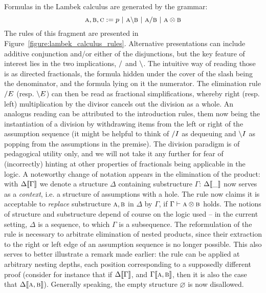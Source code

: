 Formulas in the Lambek calculus are generated by the grammar:
\begin{equation}
\prop{a}, \prop{b}, \prop{c} := p \ | \ \prop{a} \divleft \prop{b} \ | \ \prop{a} \divright \prop{b} \ | \ \prop{a} \otimes \prop{b}
\label{equation:LC}
\end{equation}
The rules of this fragment are presented in Figure~\ref{figure:lambek_calculus_rules}.
Alternative presentations can include additive conjunction and/or either of the disjunctions, but the key feature of interest lies in the two implications, $/$ and $\backslash$.
The intuitive way of reading those is as directed fractionals, the formula hidden under the cover of the slash being the denominator, and the formula lying on it the numerator.
The elimination rule $/ E$ (resp. $\backslash E$) can then be read as fractional simplifications, whereby right (resp. left) multiplication by the divisor cancels out the division as a whole.
An analogus reading can be attributed to the introduction rules, them now being the instantiation of a division by withdrawing items from the left or right of the assumption sequence (it might be helpful to think of $/ I$ as dequeuing and $\backslash I$ as popping from the assumptions in the premise).
The division paradigm is of pedagogical utility only, and we will not take it any further for fear of (incorrectly) hinting at other properties of fractionals being applicable in the logic.
A noteworthy change of notation appears in the elimination of the product: with $\Delta\llbracket{\Gamma}\rrbracket$ we denote a structure $\Delta$ containing substructure $\Gamma$: $\Delta\llbracket{\_}\rrbracket$ now serves as a \textit{context}, i.e. a structure of assumptions with a hole.
The rule now claims it is acceptable to \textit{replace} substructure $\normalfont\textsc{a}, \normalfont\textsc{b}$ in $\Delta$ by $\Gamma$, if $\Gamma \vdash \normalfont\textsc{a}\otimes\normalfont\textsc{b}$ holds.
The notions of structure and substructure depend of course on the logic used -- in the current setting, $\Delta$ is a sequence, to which $\Gamma$ is a subsequence. 
The reformulation of the rule is necessary to arbitrate elimination of nested products, since their extraction to the right or left edge of an assumption sequence is no longer possible.
This also serves to better illustrate a remark made earlier: the rule can be applied at arbitrary nesting depths, each position corresponding to a supposedly different proof (consider for instance that if $\Delta\llbracket{\Gamma}\rrbracket$, and $\Gamma\llbracket{\ensuremath{\normalfont\textsc{a}}, \ensuremath{\normalfont\textsc{b}}}\rrbracket$, then it is also the case that $\Delta\ctx{\prop{a}, \prop{b}}$).
Generally speaking, the empty structure $\varnothing$ is now disallowed.

